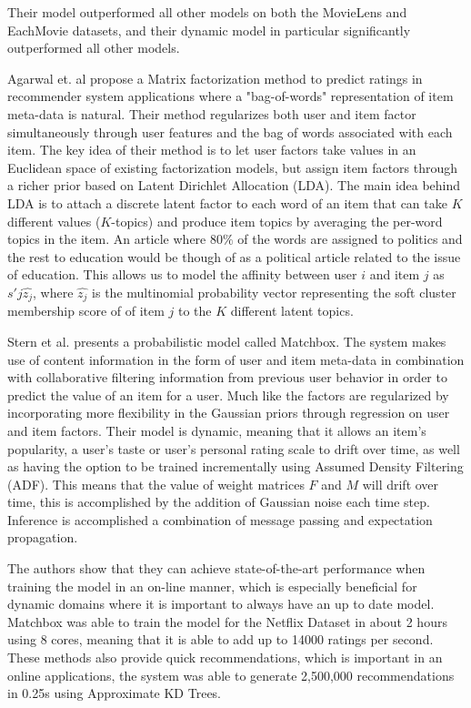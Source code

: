 Their model outperformed all other models on both the MovieLens and EachMovie
datasets, and their dynamic model in particular significantly outperformed all
other models.


Agarwal et. al \cite{Agarwal2010} propose a Matrix factorization method to
predict ratings in recommender system applications where a "bag-of-words"
representation of item meta-data is natural. Their method regularizes both user
and item factor simultaneously through user features and the bag of words
associated with each item. The key idea of their method is to let user factors
take values in an Euclidean space of existing factorization models, but assign
item factors through a richer prior based on Latent Dirichlet Allocation (LDA).
The main idea behind LDA is to attach a discrete latent factor to each word of
an item that can take $K$ different values ($K$-topics) and produce item topics
by averaging the per-word topics in the item. An article where 80$\%$ of the
words are assigned to politics and the rest to education would be though of as
a political article related to the issue of education. This allows us to model
the affinity between user $i$ and item $j$ as $s'{j}\hat{z_{j}}$, where
$\hat{z_{j}}$ is the multinomial probability vector representing the soft
cluster membership score of of item $j$ to the $K$ different latent topics.


Stern et al. \cite{Stern2009} presents a probabilistic model called Matchbox.
The system makes use of content information in the form of user and item
meta-data in combination with collaborative filtering information from previous
user behavior in order to predict the value of an item for a user. Much like
\cite{Agarwal2009} the factors are regularized by incorporating more
flexibility in the Gaussian priors through regression on user and item factors.
Their model is dynamic, meaning that it allows an item's popularity, a user's
taste or user's personal rating scale to drift over time, as well as having the
option to be trained incrementally using Assumed Density Filtering (ADF). This
means that the value of weight matrices $F$ and $M$ will drift over time, this
is accomplished by the addition of Gaussian noise each time step. Inference is
accomplished a combination of message passing and expectation propagation.

The authors show that they can achieve state-of-the-art performance when
training the model in an on-line manner, which is especially beneficial for
dynamic domains where it is important to always have an up to date model.
Matchbox was able to train the model for the Netflix Dataset in about 2 hours
using 8 cores, meaning that it is able to add up to 14000 ratings per second.
These methods also provide quick recommendations, which is important in an
online applications, the system was able to generate 2,500,000 recommendations
in 0.25s using Approximate KD Trees.

